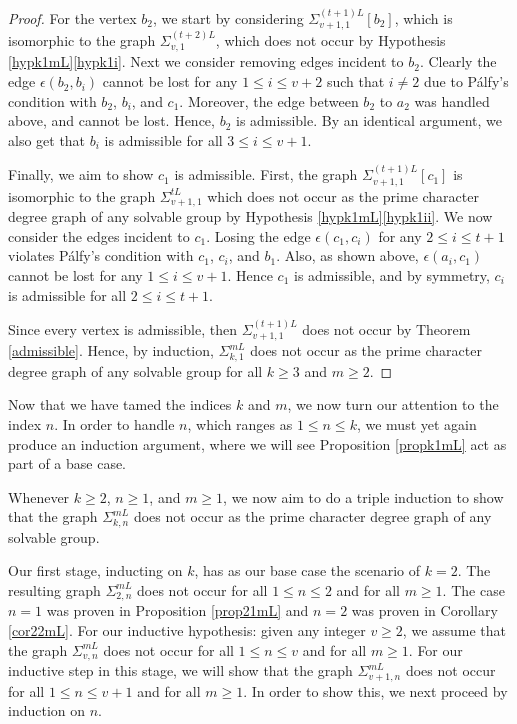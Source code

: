 \documentclass[11pt]{amsart}
\theoremstyle{definition}
\theoremstyle{remark}
\numberwithin{equation}{section}
\newcommand{\SLi}[3]{\Sigma_{#1,#2}^{#3L}} %
\begin{document}
\begin{proof}
For the vertex $b_2$, we start by considering $\SLi{v+1}{1}{(t+1)}[b_2]$, which is isomorphic to the graph $\SLi{v}{1}{(t+2)}$, which does not occur by Hypothesis \ref{hypk1mL}\eqref{hypk1i}. Next we consider removing edges incident to $b_2$. Clearly the edge $\epsilon(b_2,b_i)$ cannot be lost for any $1\leq i\leq v+2$ such that $i\neq2$ due to P\'alfy's condition with $b_2$, $b_i$, and $c_1$. Moreover, the edge between $b_2$ to $a_2$ was handled above, and cannot be lost. Hence, $b_2$ is admissible. By an identical argument, we also get that $b_i$ is admissible for all $3\leq i\leq v+1$.


Finally, we aim to show $c_1$ is admissible. First, the graph $\SLi{v+1}{1}{(t+1)}[c_1]$ is isomorphic to the graph $\SLi{v+1}{1}{t}$ which does not occur as the prime character degree graph of any solvable group by Hypothesis \ref{hypk1mL}\eqref{hypk1ii}. We now consider the edges incident to $c_1$. Losing the edge $\epsilon(c_1, c_i)$ for any $2 \leq i \leq t + 1$ violates P\'alfy's condition with $c_1$, $c_i$, and $b_1$. Also, as shown above, $\epsilon(a_i,c_1)$ cannot be lost for any $1\leq i\leq v+1$. Hence $c_1$ is admissible, and by symmetry, $c_i$ is admissible for all $2\leq i\leq t+1$.

Since every vertex is admissible, then $\SLi{v+1}{1}{(t+1)}$ does not occur by Theorem \ref{admissible}. Hence, by induction, $\SLi{k}{1}{m}$ does not occur as the prime character degree graph of any solvable group for all $k\geq3$ and $m\geq2$.
\end{proof}

Now that we have tamed the indices $k$ and $m$, we now turn our attention to the index $n$. In order to handle $n$, which ranges as $1\leq n\leq k$, we must yet again produce an induction argument, where we will see Proposition \ref{propk1mL} act as part of a base case.

Whenever $k\geq2$, $n\geq1$, and $m\geq1$, we now aim to do a triple induction to show that the graph $\SLi{k}{n}{m}$ does not occur as the prime character degree graph of any solvable group.

Our first stage, inducting on $k$, has as our base case the scenario of $k = 2$. The resulting graph $\SLi{2}{n}{m}$ does not occur for all $1\leq n \leq 2$ and for all $m \geq 1$. The case $n = 1$ was proven in Proposition \ref{prop21mL} and $n = 2$ was proven in Corollary \ref{cor22mL}. For our inductive hypothesis: given any integer $v\geq 2$, we assume that the graph $\SLi{v}{n}{m}$ does not occur for all $1\leq n \leq v$ and for all $m\geq 1$. For our inductive step in this stage, we will show that the graph $\SLi{v+1}{n}{m}$ does not occur for all $1 \leq n \leq v+1$ and for all $m \geq 1$. In order to show this, we next proceed by induction on $n$.
\end{document}
